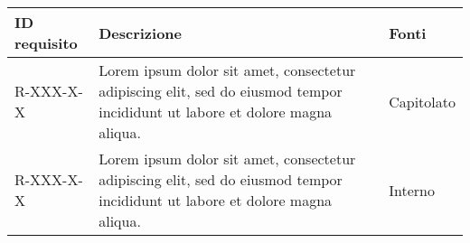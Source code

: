 \begin{table}[H]
    \begin{tabular}{|C{2.8cm}|C{9.5cm}|C{2.3cm}|}
        \hline
         \textbf{ID requisito} &  
         \textbf{Descrizione} &  
         \textbf{Fonti}  \\
          \hline
          R-XXX-X-X & Lorem ipsum dolor sit amet, consectetur adipiscing elit, sed do eiusmod tempor incididunt ut labore et dolore magna aliqua. & Capitolato \\
          \hline 
          R-XXX-X-X & Lorem ipsum dolor sit amet, consectetur adipiscing elit, sed do eiusmod tempor incididunt ut labore et dolore magna aliqua. & Interno \\
          \hline
    \end{tabular}

\end{table}